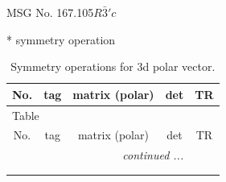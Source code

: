 \documentclass[fleqn,8pt]{jsarticle}
\begin{document}
\setcounter{MaxMatrixCols}{32}

\renewcommand{\tablename}{Table~}
\renewcommand{\figurename}{Figure~}
\begin{center}
\LARGE
MSG No. 167.105\quad$R\bar{3}'c$
\end{center}
* symmetry operation
\renewcommand{\arraystretch}{1.3}
\begin{longtable}{ccccc}
\caption{Symmetry operations for 3d polar vector.}
 \\
 \hline \hline
No. & tag & matrix (polar) & det & TR \\ \hline \endfirsthead

\multicolumn{4}{l}{\tablename\ \thetable{}} \\
 \hline \hline
No. & tag & matrix (polar) & det & TR \\ \hline \endhead

 \hline \hline
\multicolumn{4}{r}{\footnotesize\it continued ...} \\ \endfoot

 \hline \hline
\multicolumn{4}{r}{} \\ \endlastfoot


\end{longtable}
\end{document}
